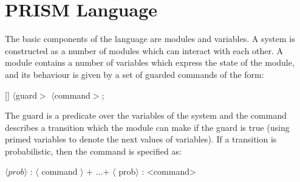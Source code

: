 \documentclass{llncs}
\begin{document}
\section{PRISM Language}
\label{sec:prism_lang}
The basic components of the language are modules and variables. A
system is constructed as a number of modules which can interact with each other.
A module contains a number of variables which express the state of the module,
and its behaviour is given by a set of guarded commands of the form:

[] $\langle$guard$>$ \! $\langle$command$>$;

The guard is a predicate over the variables of the system and the command describes
a transition which the module can make if the guard is true (using primed variables
to denote the next values of variables). If a transition is probabilistic, then the
command is specified as:

$\langle prob \rangle$ : $\langle$ command $\rangle$ + ...+ $\langle$ prob$\rangle$ : <command>
\end{document}
